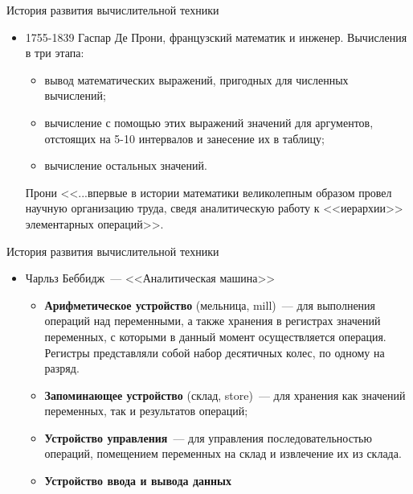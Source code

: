 \documentclass[aspectratio=169,14pt]{beamer}
\begin{document}
\begin{frame}{История развития вычислительной техники}
    \begin{itemize}
        \item 1755-1839 Гаспар Де Прони, французский математик и инженер. Вычисления в три этапа:
        \begin{itemize}
            \item вывод математических выражений, пригодных для численных вычислений;
            \item вычисление с помощью этих выражений значений для аргументов, отстоящих
            на 5-10 интервалов и занесение их в таблицу;
            \item вычисление остальных значений.
        \end{itemize}
        Прони <<...впервые в истории математики великолепным образом провел научную организацию труда,
        сведя аналитическую работу к <<иерархии>> элементарных операций>>.
    \end{itemize}
\end{frame}

\begin{frame}{История развития вычислительной техники}
    \begin{itemize}
        \item Чарльз Беббидж~--- <<Аналитическая машина>>
        \begin{itemize}
            \item \textbf{Арифметическое устройство} (мельница, mill)~--- для выполнения операций над
            переменными, а также хранения в регистрах значений переменных, с которыми в данный
            момент осуществляется операция. Регистры представляли собой набор десятичных колес,
            по одному на разряд.
            \item \textbf{Запоминающее устройство} (склад, store)~--- для хранения как значений переменных,
            так и результатов операций;
            \item \textbf{Устройство управления}~--- для управления последовательностью операций,
            помещением переменных на склад и извлечение их из склада.
            \item \textbf{Устройство ввода и вывода данных}
        \end{itemize}
    \end{itemize}
\end{frame}
\end{document}
